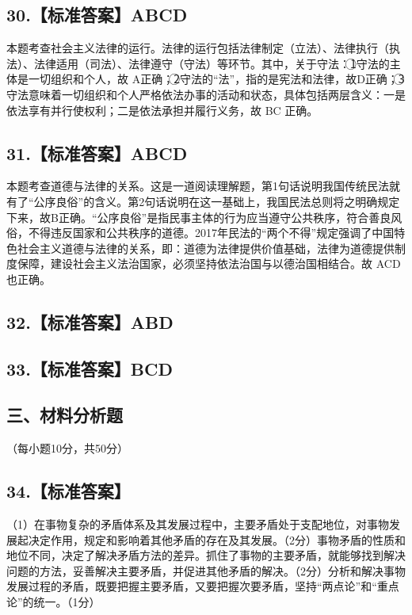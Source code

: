 \documentclass[UTF8,11pt]{ctexart}
\begin{document}
\subsection*{30.【标准答案】ABCD}

本题考查社会主义法律的运行。法律的运行包括法律制定（立法）、法律执行（执法）、法律适用（司法）、法律遵守（守法）等环节。其中，关于守法：\textcircled{1}守法的主体是一切组织和个人，故 A正确；\textcircled{2}守法的“法”，指的是宪法和法律，故D正确；\textcircled{3}守法意味着一切组织和个人严格依法办事的活动和状态，具体包括两层含义：一是依法享有并行使权利；二是依法承担并履行义务，故 BC 正确。


\subsection*{31.【标准答案】ABCD}

本题考查道德与法律的关系。这是一道阅读理解题，第1句话说明我国传统民法就有了“公序良俗”的含义。第2句话说明在这一基础上，我国民法总则将之明确规定下来，故B正确。“公序良俗”是指民事主体的行为应当遵守公共秩序，符合善良风俗，不得违反国家和公共秩序的道德。2017年民法的“两个不得”规定强调了中国特色社会主义道德与法律的关系，即：道德为法律提供价值基础，法律为道德提供制度保障，建设社会主义法治国家，必须坚持依法治国与以德治国相结合。故 ACD也正确。


\subsection*{32.【标准答案】ABD}

\subsection*{33.【标准答案】BCD}

\subsection*{三、材料分析题}

（每小题10分，共50分）


\subsection*{34.【标准答案】}

（1）在事物复杂的矛盾体系及其发展过程中，主要矛盾处于支配地位，对事物发展起决定作用，规定和影响着其他矛盾的存在及其发展。（2分）事物矛盾的性质和地位不同，决定了解决矛盾方法的差异。抓住了事物的主要矛盾，就能够找到解决问题的方法，妥善解决主要矛盾，并促进其他矛盾的解决。（2分）分析和解决事物发展过程的矛盾，既要把握主要矛盾，又要把握次要矛盾，坚持“两点论”和“重点论”的统一。（1分）
\end{document}

